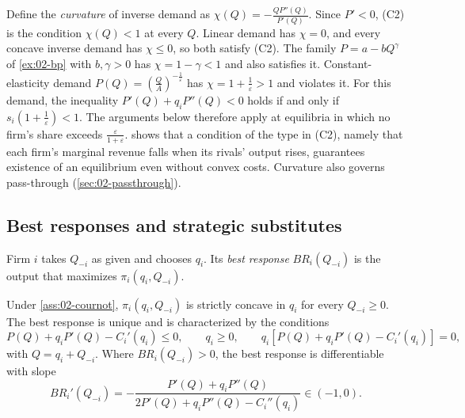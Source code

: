\begin{remark}[Interpreting (C2)]\label{rem:02-c2}
Define the \emph{curvature} of inverse demand as $\chi(Q) = -\frac{QP''(Q)}{P'(Q)}$. Since $P' < 0$, (C2) is the
condition $\chi(Q) < 1$ at every $Q$. Linear demand has $\chi = 0$, and every concave inverse demand has
$\chi \le 0$, so both satisfy (C2). The family $P = a - bQ^{\gamma}$ of \cref{ex:02-bp} with $b, \gamma > 0$ has
$\chi = 1 - \gamma < 1$ and also satisfies it. Constant-elasticity demand $P(Q) = \left(\frac{Q}{A}\right)^{-\frac{1}{\varepsilon}}$
has $\chi = 1 + \frac{1}{\varepsilon} > 1$ and violates it. For this demand, the inequality
$P'(Q) + q_iP''(Q) < 0$ holds if and only if $s_i\left(1 + \frac{1}{\varepsilon}\right) < 1$. The arguments below
therefore apply at equilibria in which no firm's share exceeds $\frac{\varepsilon}{1 + \varepsilon}$.
\citet{Novshek1985} shows that a condition of the type in (C2), namely that each firm's marginal revenue falls when
its rivals' output rises, guarantees existence of an equilibrium even without convex costs. Curvature also governs
pass-through (\cref{sec:02-passthrough}).
\end{remark}

\subsection{Best responses and strategic substitutes}\label{sec:02-cournot-br}

Firm $i$ takes $Q_{-i}$ as given and chooses $q_i$. Its \emph{best response} $BR_i(Q_{-i})$ is the output that
maximizes $\pi_i(q_i, Q_{-i})$.

\begin{lemma}\label{lem:02-cournot-br}
Under \cref{ass:02-cournot}, $\pi_i(q_i, Q_{-i})$ is strictly concave in $q_i$ for every $Q_{-i} \ge 0$. The best
response is unique and is characterized by the conditions
\begin{equation}\label{eq:02-cournot-foc}
  P(Q) + q_iP'(Q) - C_i'(q_i) \le 0, \qquad q_i \ge 0, \qquad q_i\left[P(Q) + q_iP'(Q) - C_i'(q_i)\right] = 0,
\end{equation}
with $Q = q_i + Q_{-i}$. Where $BR_i(Q_{-i}) > 0$, the best response is differentiable with slope
\begin{equation}\label{eq:02-br-slope}
  BR_i'(Q_{-i}) = -\frac{P'(Q) + q_iP''(Q)}{2P'(Q) + q_iP''(Q) - C_i''(q_i)} \in (-1, 0) .
\end{equation}
\end{lemma}

